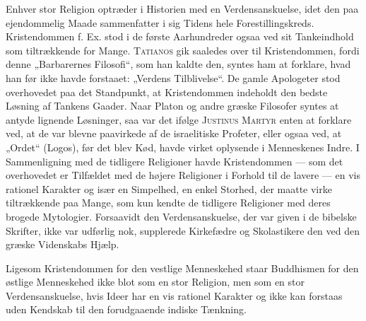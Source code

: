 \documentclass[12pt,a4paper,openany]{book}
\newcommand{\opage}[1]{\marginnote{\footnotesize\textit{[#1]}}}
\begin{document}
Enhver stor Religion optræder i Historien med en Verdensanskuelse, idet
den paa ejendommelig Maade sammenfatter i sig Tidens hele
Forestillingskreds. Kristendommen f. Ex. stod i de første Aarhundreder
ogsaa ved sit Tankeindhold som tiltrækkende for Mange. \textsc{Tatianos}
gik saaledes over til Kristendommen, fordi denne „Barbarernes Filosofi“,
som han kaldte den, syntes ham at forklare, hvad han før ikke havde
forstaaet: „Verdens Tilblivelse“.
\opage{16}De gamle Apologeter stod overhovedet paa det Standpunkt, at
Kristendommen indeholdt den bedste Løsning af Tankens Gaader. Naar
Platon og andre græske Filosofer syntes at antyde lignende Løsninger,
saa var det ifølge \textsc{Justinus Martyr} enten at forklare ved, at de
var blevne paavirkede af de israelitiske Profeter, eller ogsaa ved, at
„Ordet“ (Logos), før det blev Kød, havde virket oplysende i Menneskenes
Indre. I Sammenligning med de tidligere Religioner havde Kristendommen
--- som det overhovedet er Tilfældet med de højere Religioner i Forhold
til de lavere --- en vis rationel Karakter og især en Simpelhed, en
enkel Storhed, der maatte virke tiltrækkende paa Mange, som kun kendte
de tidligere Religioner med deres brogede Mytologier. Forsaavidt den
Verdensanskuelse, der var given i de bibelske Skrifter, ikke var
udførlig nok, supplerede Kirkefædre og Skolastikere den ved den græske
Videnskabs Hjælp.

Ligesom Kristendommen for den vestlige Menneskehed staar Buddhismen for
den østlige Menneskehed ikke blot som en stor Religion, men som en stor
Verdensanskuelse, hvis Ideer har en vis rationel Karakter og ikke kan
forstaas uden Kendskab til den forudgaaende indiske Tænkning.
\end{document}
